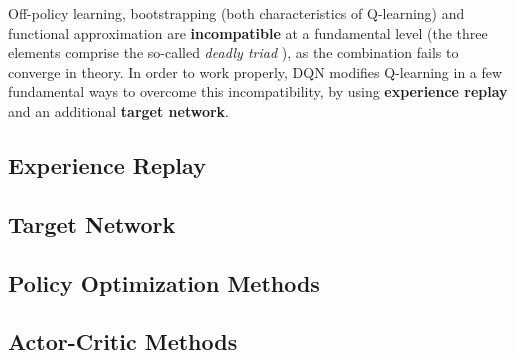 Off-policy learning, bootstrapping (both characteristics of Q-learning) and functional approximation are \textbf{incompatible} at a fundamental level (the three elements comprise the so-called \emph{deadly triad} \cite{rlai}), as the combination fails to converge in theory.
In order to work properly, DQN modifies Q-learning in a few fundamental ways to overcome this incompatibility, by using \textbf{experience replay} and an additional \textbf{target network}.

\subsection{Experience Replay}
% 

\subsection{Target Network}
% 

\subsection{Policy Optimization Methods} \label{section:policy-opt}

\subsection{Actor-Critic Methods} \label{section:actor-critic}
